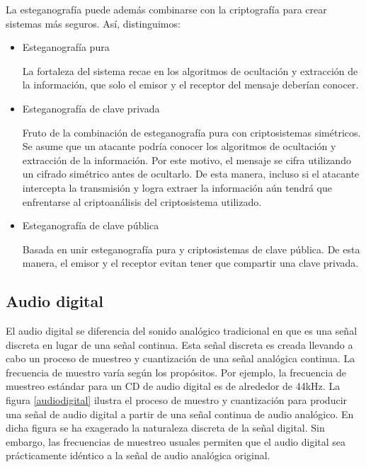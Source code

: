\documentclass[12pt]{article}
\begin{document}
La esteganografía puede además combinarse con la criptografía para crear sistemas más seguros. Así, distinguimos:

\begin{itemize}

\item Esteganografía pura

La fortaleza del sistema recae en los algoritmos de ocultación y extracción de la información, que solo el emisor y el receptor del mensaje deberían conocer.

\item Esteganografía de clave privada

Fruto de la combinación de esteganografía pura con criptosistemas simétricos. Se asume que un atacante podría conocer los algoritmos de ocultación y extracción de la información. Por este motivo, el mensaje se cifra utilizando un cifrado simétrico antes de ocultarlo. De esta manera, incluso si el atacante intercepta la transmisión y logra extraer la información aún tendrá que enfrentarse al criptoanálisis del criptosistema utilizado.

\item Esteganografía de clave pública

Basada en unir esteganografía pura y criptosistemas de clave pública. De esta manera, el emisor y el receptor evitan tener que compartir una clave privada.

\end{itemize}

\subsection{Audio digital}

El audio digital se diferencia del sonido analógico tradicional en que es una señal discreta en lugar de una señal continua. Esta señal discreta es creada llevando a cabo un proceso de muestreo y cuantización de una señal analógica continua. La frecuencia de muestro varía según los propósitos. Por ejemplo, la frecuencia de muestreo estándar para un CD de audio digital es de alrededor de 44kHz. La figura \ref{audiodigital} ilustra el proceso de muestro y cuantización para producir una señal de audio digital a partir de una señal continua de audio analógico.
En dicha figura se ha exagerado la naturaleza discreta de la señal digital. Sin embargo, las frecuencias de muestreo usuales permiten que el audio digital sea prácticamente idéntico a la señal de audio analógica original.
\end{document}
